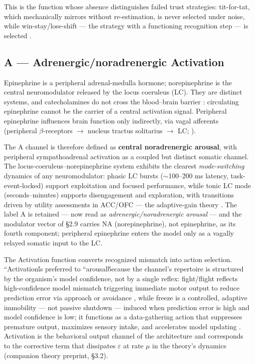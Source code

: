 \documentclass[11pt,twocolumn]{article}
\theoremstyle{plain}
\begin{document}
This is the function whose absence distinguishes failed trust strategies: tit-for-tat, which mechanically mirrors without re-estimation, is never selected under noise, while win-stay/lose-shift — the strategy with a functioning recognition step — is selected \citep{imhof2007}.

\subsection{A — Adrenergic/noradrenergic Activation}

Epinephrine is a peripheral adrenal-medulla hormone; norepinephrine is the central neuromodulator released by the locus coeruleus (LC). They are distinct systems, and catecholamines do not cross the blood–brain barrier \citep{kostrzewa2007,tank2015}: circulating epinephrine cannot be the carrier of a central activation signal. Peripheral epinephrine influences brain function only indirectly, via vagal afferents (peripheral $\beta$-receptors $\to$ nucleus tractus solitarius $\to$ LC; \citealp{miyashita2006}).

The A channel is therefore defined as \textbf{central noradrenergic arousal}, with peripheral sympathoadrenal activation as a coupled but distinct somatic channel. The locus-coeruleus–norepinephrine system exhibits the clearest \textit{mode-switching} dynamics of any neuromodulator: phasic LC bursts ($\sim$100–200 ms latency, task-event-locked) support exploitation and focused performance, while tonic LC mode (seconds–minutes) supports disengagement and exploration, with transitions driven by utility assessments in ACC/OFC — the adaptive-gain theory \citep{astonjones2005,berridge2003}. The label A is retained — now read as \textit{adrenergic/noradrenergic arousal} — and the modulator vector of \S{}2.9 carries NA (norepinephrine), not epinephrine, as its fourth component; peripheral epinephrine enters the model only as a vagally relayed somatic input to the LC.

The Activation function converts recognized mismatch into action selection. ``Activation\'\' is preferred to ``arousal\'\' because the channel's repertoire is structured by the organism's model confidence, not by a single reflex: fight/flight reflects high-confidence model mismatch triggering immediate motor output to reduce prediction error via approach or avoidance \citep{cannon1929,fanselow1988}, while freeze is a controlled, adaptive immobility — not passive shutdown — induced when prediction error is high and model confidence is low; it functions as a data-gathering action that suppresses premature output, maximizes sensory intake, and accelerates model updating \citep{blanchard1988,deberker2016}. Activation is the behavioral output channel of the architecture and corresponds to the corrective term that dissipates $\varepsilon$ at rate $\mu$ in the theory's dynamics (companion theory preprint, \S{}3.2).
\end{document}
